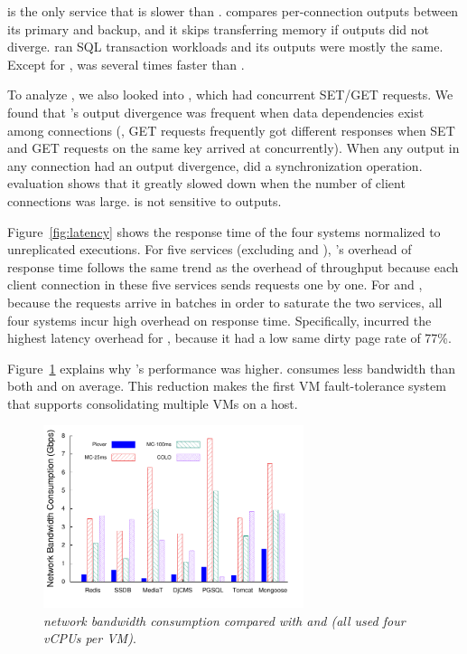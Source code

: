 \pgsql is the only service that \yyy is slower than \colo. \colo compares 
per-connection outputs between its primary and backup, and it 
skips transferring memory if outputs did not diverge. \pgsql ran SQL 
transaction workloads and its outputs were mostly the same. Except for 
\pgsql, \yyy was several times faster than \colo. 

To analyze \colo, we also looked into \ssdb, which 
had concurrent SET/GET requests. We found that \colo's output divergence 
was frequent when data dependencies exist among connections (\ie, GET 
requests frequently got different responses when SET and GET requests on the 
same key arrived at \ssdb concurrently). When any output in any connection 
had an output divergence, \colo did a synchronization operation. \colo 
evaluation shows that it greatly slowed down when the number of client 
connections was large. \yyy is not sensitive to outputs.

Figure~\ref{fig:latency} shows the response time of the four systems normalized 
to unreplicated executions. For five services (excluding \redis and \ssdb), 
\xxx's overhead of response time follows the same trend as the 
overhead of throughput because each client connection in these five services 
sends requests one by one. For \redis and \ssdb, because the requests arrive in 
batches in order to saturate the two services, all four systems incur 
high overhead on response time. Specifically, \yyy incurred the highest latency
overhead for \ssdb, because it had a low same dirty page rate of 
77\%. 

Figure~\ref{fig:bandwidth} explains why \yyy's performance was higher. 
\yyy consumes \avgbandwidth less bandwidth than both \qemumc
and \colo on average. This reduction makes \yyy the first VM fault-tolerance 
system that supports consolidating multiple VMs on a host.

\begin{figure}[htbp]
\centering
\includegraphics[width=3in]{figures/FIG2__network_bandwidth}
\caption{{\em \yyy network bandwidth consumption compared with \qemumc and 
\colo (all used four vCPUs per VM)}.}
\label{fig:bandwidth}
\end{figure}

